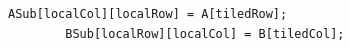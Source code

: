 \documentclass[review=false, sigchi]{acmart}
\begin{document}
	\begin{lstlisting}[firstnumber=20]
		ASub[localCol][localRow] = A[tiledRow];
		BSub[localRow][localCol] = B[tiledCol];
	\end{lstlisting}
	

\end{document}
